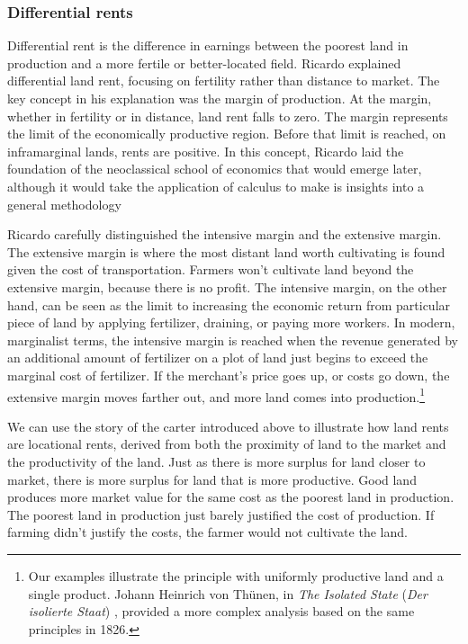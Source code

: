 
\subsubsection{Differential rents}

Differential rent is the difference in earnings between the poorest land in production and a more fertile or better-located field. Ricardo explained differential land rent, focusing on fertility rather than distance to market. 
The key concept in his explanation was the margin of production. 
At the \gls{margin}, whether in fertility or in distance, land \gls{rent} falls to zero.  The margin represents the limit of the economically productive region.  
Before that limit is reached, on \gls{inframarginal} lands, rents are positive. In  this concept, Ricardo laid the foundation of the neoclassical school of economics that would emerge later, although it would take the application of calculus to make is insights into a general methodology 

Ricardo carefully distinguished the \gls{intensive margin} and the \gls{extensive margin}. The extensive margin is where the most distant land worth cultivating is found given the cost of transportation. Farmers won't cultivate land beyond the extensive margin, because there is no profit. The intensive margin, on the other hand, can be seen as the limit to increasing the economic return from  particular piece of land by applying fertilizer, draining, or paying more workers. In modern, \gls{marginalist} terms, the intensive margin is reached when the revenue generated by an additional amount of fertilizer on a plot of land just begins to exceed the marginal cost of fertilizer. If the merchant's price goes up, or costs go down, the \gls{extensive margin} moves farther out, and more land comes into production.\footnote{Our examples illustrate the principle with uniformly productive land and a single product. Johann Heinrich von Th\"unen, in \textit{The Isolated State} (\textit{Der isolierte Staat}) \cite{vonthunenIsolirteStaatBeziehung1826}, provided a more complex analysis based on the same principles in 1826.}

We can use the story of the carter introduced above to illustrate how land rents are locational rents, derived from both the proximity of land to the market and the productivity of the land. Just as there is more surplus for land closer to market, there is more surplus for land that is more productive. Good land produces more market value for the same cost as the poorest land in production. The poorest land in production just barely justified the cost of production. If farming didn't justify the costs, the farmer would not cultivate the land. 

